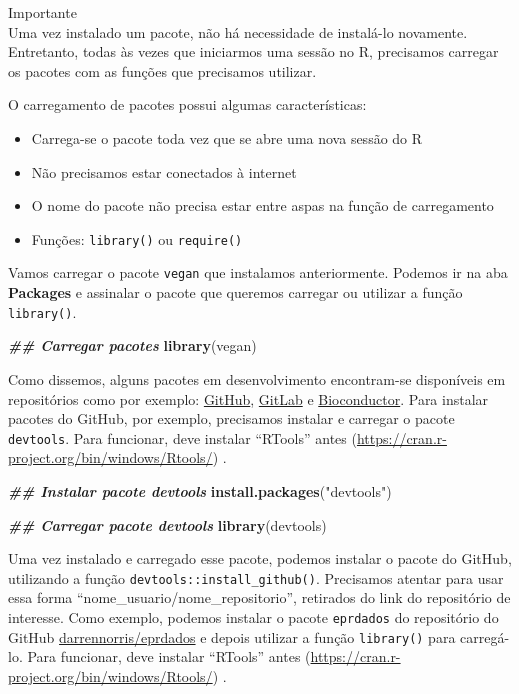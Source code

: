 \documentclass[
]{article}
\newenvironment{Shaded}{\begin{snugshade}}{\end{snugshade}}
\newcommand{\DocumentationTok}[1]{\textcolor[rgb]{0.56,0.35,0.01}{\textbf{\textit{#1}}}}
\newcommand{\FunctionTok}[1]{\textcolor[rgb]{0.13,0.29,0.53}{\textbf{#1}}}
\newcommand{\NormalTok}[1]{#1}
\newcommand{\StringTok}[1]{\textcolor[rgb]{0.31,0.60,0.02}{#1}}
\providecommand{\tightlist}{%
  \setlength{\itemsep}{0pt}\setlength{\parskip}{0pt}}
\begin{document}
Importante \\
Uma vez instalado um pacote, não há necessidade de instalá-lo novamente. Entretanto, todas às vezes que iniciarmos uma sessão no R, precisamos carregar os pacotes com as funções que precisamos utilizar.

O carregamento de pacotes possui algumas características:

\begin{itemize}
\tightlist
\item
  Carrega-se o pacote toda vez que se abre uma nova sessão do R
\item
  Não precisamos estar conectados à internet
\item
  O nome do pacote não precisa estar entre aspas na função de carregamento
\item
  Funções: \texttt{library()} ou \texttt{require()}
\end{itemize}

Vamos carregar o pacote \texttt{vegan} que instalamos anteriormente. Podemos ir na aba \textbf{Packages} e assinalar o pacote que queremos carregar ou utilizar a função \texttt{library()}.

\begin{Shaded}
\begin{Highlighting}[]
\DocumentationTok{\#\# Carregar pacotes}
\FunctionTok{library}\NormalTok{(vegan)}
\end{Highlighting}
\end{Shaded}

Como dissemos, alguns pacotes em desenvolvimento encontram-se disponíveis em repositórios como por exemplo: \href{https://github.com/}{GitHub}, \href{https://gitlab.com}{GitLab} e \href{https://www.bioconductor.org/}{Bioconductor}. Para instalar pacotes do GitHub, por exemplo, precisamos instalar e carregar o pacote \texttt{devtools}. Para funcionar, deve instalar ``RTools'' antes (\url{https://cran.r-project.org/bin/windows/Rtools/}) .

\begin{Shaded}
\begin{Highlighting}[]
\DocumentationTok{\#\# Instalar pacote devtools}
\FunctionTok{install.packages}\NormalTok{(}\StringTok{"devtools"}\NormalTok{)}

\DocumentationTok{\#\# Carregar pacote devtools}
\FunctionTok{library}\NormalTok{(devtools)}
\end{Highlighting}
\end{Shaded}

Uma vez instalado e carregado esse pacote, podemos instalar o pacote do GitHub, utilizando a função \texttt{devtools::install\_github()}. Precisamos atentar para usar essa forma ``nome\_usuario/nome\_repositorio'', retirados do link do repositório de interesse. Como exemplo, podemos instalar o pacote \texttt{eprdados} do repositório do GitHub \href{https://github.com/darrennorris/eprdados}{darrennorris/eprdados} e depois utilizar a função \texttt{library()} para carregá-lo. Para funcionar, deve instalar ``RTools'' antes (\url{https://cran.r-project.org/bin/windows/Rtools/}) .
\end{document}
